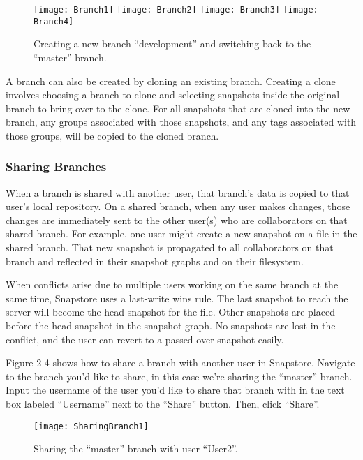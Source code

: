 \begin{figure}
\texttt{[image: Branch1]}
\texttt{[image: Branch2]}
\texttt{[image: Branch3]}
\texttt{[image: Branch4]}
\caption{Creating a new branch ``development'' and switching back to the ``master'' branch.}
\label{arm:fig1}
\end{figure}

A branch can also be created by cloning an existing branch. Creating a clone involves choosing a branch to clone and selecting snapshots inside the original branch to bring over to the clone. For all snapshots that are cloned into the new branch, any groups associated with those snapshots, and any tags associated with those groups, will be copied to the cloned branch.

\subsubsection{Sharing Branches}

When a branch is shared with another user, that branch's data is copied to that user's local repository. On a shared branch, when any user makes changes, those changes are immediately sent to the other user(s) who are collaborators on that shared branch. For example, one user might create a new snapshot on a file in the shared branch. That new snapshot is propagated to all collaborators on that branch and reflected in their snapshot graphs and on their filesystem.

When conflicts arise due to multiple users working on the same branch at the same time, Snapstore uses a last-write wins rule. The last snapshot to reach the server will become the head snapshot for the file. Other snapshots are placed before the head snapshot in the snapshot graph. No snapshots are lost in the conflict, and the user can revert to a passed over snapshot easily.

Figure 2-4 shows how to share a branch with another user in Snapstore. Navigate to the branch you'd like to share, in this case we're sharing the ``master'' branch. Input the username of the user you'd like to share that branch with in the text box labeled ``Username'' next to the ``Share'' button. Then, click ``Share''.

\begin{figure}
\begin{center}
\texttt{[image: SharingBranch1]}
\caption{Sharing the ``master'' branch with user ``User2''.}
\label{arm:fig1}
\end{center}
\end{figure}

